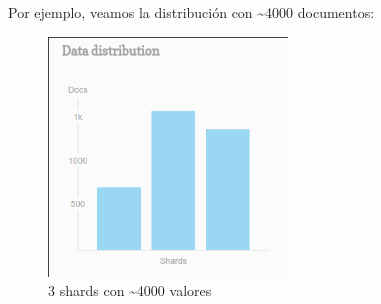 Por ejemplo, veamos la distribución con \textasciitilde 4000 documentos:
\begin{figure}[H]
 \centering
 \includegraphics[width=2.5in]{sharding/img/3shard4000.png}
 \caption{3 shards con \textasciitilde 4000 valores}
 \label{fig:3shard4000}
\end{figure}
